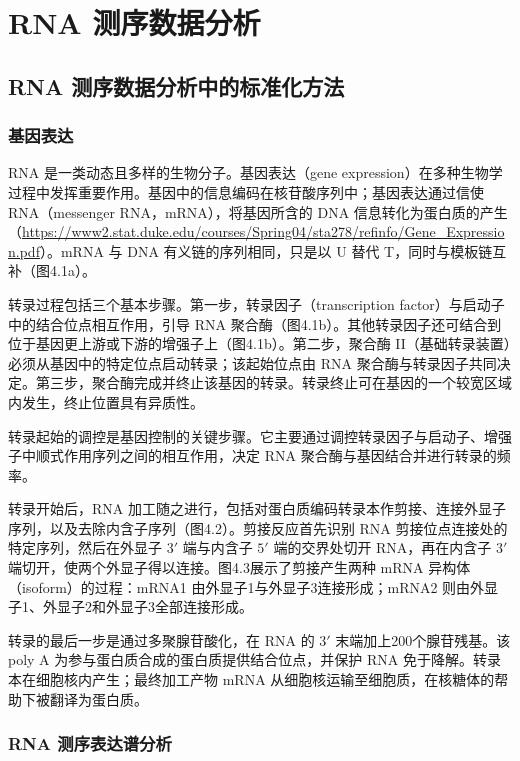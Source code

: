 \chapter{RNA 测序数据分析}
\label{ch:rna-seq}
\section{RNA 测序数据分析中的标准化方法}
\subsection{基因表达}

RNA 是一类动态且多样的生物分子。基因表达（gene expression）在多种生物学过程中发挥重要作用。基因中的信息编码在核苷酸序列中；基因表达通过信使 RNA（messenger RNA，mRNA），将基因所含的 DNA 信息转化为蛋白质的产生（\url{https://www2.stat.duke.edu/courses/Spring04/sta278/refinfo/Gene_Expression.pdf}）。mRNA 与 DNA 有义链的序列相同，只是以 U 替代 T，同时与模板链互补（图4.1a）。

转录过程包括三个基本步骤。第一步，转录因子（transcription factor）与启动子中的结合位点相互作用，引导 RNA 聚合酶（图4.1b）。其他转录因子还可结合到位于基因更上游或下游的增强子上（图4.1b）。第二步，聚合酶 II（基础转录装置）必须从基因中的特定位点启动转录；该起始位点由 RNA 聚合酶与转录因子共同决定。第三步，聚合酶完成并终止该基因的转录。转录终止可在基因的一个较宽区域内发生，终止位置具有异质性。

转录起始的调控是基因控制的关键步骤。它主要通过调控转录因子与启动子、增强子中顺式作用序列之间的相互作用，决定 RNA 聚合酶与基因结合并进行转录的频率。

转录开始后，RNA 加工随之进行，包括对蛋白质编码转录本作剪接、连接外显子序列，以及去除内含子序列（图4.2）。剪接反应首先识别 RNA 剪接位点连接处的特定序列，然后在外显子 $3'$ 端与内含子 $5'$ 端的交界处切开 RNA，再在内含子 $3'$ 端切开，使两个外显子得以连接。图4.3展示了剪接产生两种 mRNA 异构体（isoform）的过程：mRNA1 由外显子1与外显子3连接形成；mRNA2 则由外显子1、外显子2和外显子3全部连接形成。





转录的最后一步是通过多聚腺苷酸化，在 RNA 的 $3'$ 末端加上200个腺苷残基。该 poly A 为参与蛋白质合成的蛋白质提供结合位点，并保护 RNA 免于降解。转录本在细胞核内产生；最终加工产物 mRNA 从细胞核运输至细胞质，在核糖体的帮助下被翻译为蛋白质。
\FloatBarrier

\subsection{RNA 测序表达谱分析}

